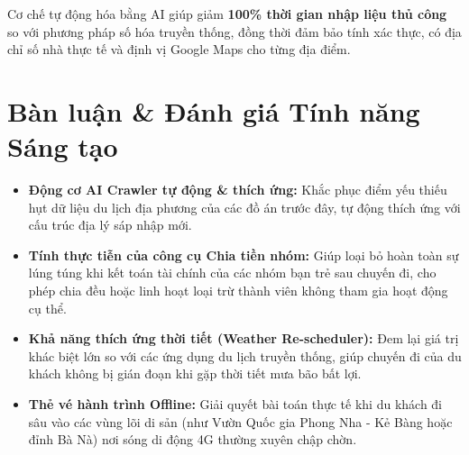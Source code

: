 \begin{ghinho}
Cơ chế tự động hóa bằng AI giúp giảm \textbf{100\% thời gian nhập liệu thủ công} so với phương pháp số hóa truyền thống, đồng thời đảm bảo tính xác thực, có địa chỉ số nhà thực tế và định vị Google Maps cho từng địa điểm.
\end{ghinho}

\section{Bàn luận \& Đánh giá Tính năng Sáng tạo}

\begin{itemize}
    \item \textbf{Động cơ AI Crawler tự động & thích ứng:} Khắc phục điểm yếu thiếu hụt dữ liệu du lịch địa phương của các đồ án trước đây, tự động thích ứng với cấu trúc địa lý sáp nhập mới.
    \item \textbf{Tính thực tiễn của công cụ Chia tiền nhóm:} Giúp loại bỏ hoàn toàn sự lúng túng khi kết toán tài chính của các nhóm bạn trẻ sau chuyến đi, cho phép chia đều hoặc linh hoạt loại trừ thành viên không tham gia hoạt động cụ thể.
    \item \textbf{Khả năng thích ứng thời tiết (Weather Re-scheduler):} Đem lại giá trị khác biệt lớn so với các ứng dụng du lịch truyền thống, giúp chuyến đi của du khách không bị gián đoạn khi gặp thời tiết mưa bão bất lợi.
    \item \textbf{Thẻ vé hành trình Offline:} Giải quyết bài toán thực tế khi du khách đi sâu vào các vùng lõi di sản (như Vườn Quốc gia Phong Nha - Kẻ Bàng hoặc đỉnh Bà Nà) nơi sóng di động 4G thường xuyên chập chờn.
\end{itemize}
